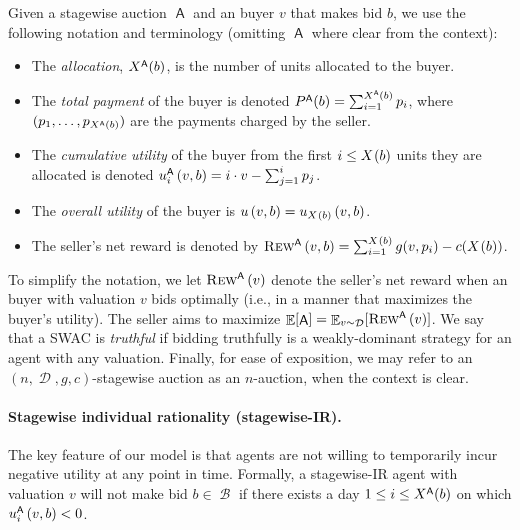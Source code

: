 \documentclass[11pt,letterpaper]{article}
\newcommand{\swir}{stagewise-IR\xspace}
\newcommand{\swac}{SWAC\xspace}
\DeclareMathOperator*{\E}{\bb{E}}
\newcommand{\bb}[1]{\mathbb{#1}}
\DeclareMathOperator{\A}{\auc{A}}
\DeclareMathOperator{\B}{\mathcal{B}}
\DeclareMathOperator{\D}{\mathcal{D}}
\newcommand{\g}{g}
\newcommand{\insumi}[2]{\sum_{i={#1}}^{#2}}
\newcommand{\insumof}[3]{\sum_{{#1}={#2}}^{#3}}
\theoremstyle{plain}
\newcommand{\auc}[1]{\mathsf{#1}}
\begin{document}
Given a stagewise auction $\A$ and an buyer $v$ that makes bid $b$, we use the following notation and terminology (omitting $\A$ where clear from the context):
\begin{itemize}
    \item The \emph{allocation}, $\x[\A]{b}$, is the number of units allocated to the buyer.
    \item The \emph{total payment} of the buyer is denoted $\p[\A]{b} = \sum_{i = 1}^{\x[\A]{b}} p_i$, where $(p_1,\ldots,p_{\x[\A]{b}})$ 
    are the payments charged by the seller.
    \item The \emph{cumulative utility} of the buyer
    from the first $i \leq \x{b}$ 
    units they are allocated is denoted
    $\utili[\A]{i}{v}{b} = i \cdot v - \insumof{j}{1}{i} p_j$.
    \item The \emph{overall utility} of the buyer is $\util{v}{b}=\utili{\x{b}}{v}{b}$.
\item The seller's net reward is denoted by
$\rew[\A]{v}{b} = \insumi{1}{\x{b}}\g(v,p_i)-c(\x{b})$.
\end{itemize}

To simplify the notation, we let $\trew[\A]{v}$ denote the seller's net reward when an buyer with valuation $v$ bids optimally (i.e., in a manner that maximizes the buyer's utility).
The seller aims to maximize $\E[\A]=\E_{v\sim\D}[\trew[\A]{v}]$. We say that a \swac is \emph{truthful} if bidding truthfully is a weakly-dominant strategy for an agent with any valuation.
Finally, for ease of exposition, we may refer to an $(n,\D,\g,c)$-stagewise auction as an $n$-auction, when the context is clear.




\paragraph{Stagewise individual rationality (\swir).}
The key feature of our model is that agents are not willing to temporarily incur negative utility at any point in time.
Formally, a \swir agent with valuation $v$
will not make bid $b \in \B$
if there exists a day $1 \leq i \leq \x[\A]{b}$
on which $\utili[\A]{i}{v}{b} < 0$.
\end{document}
